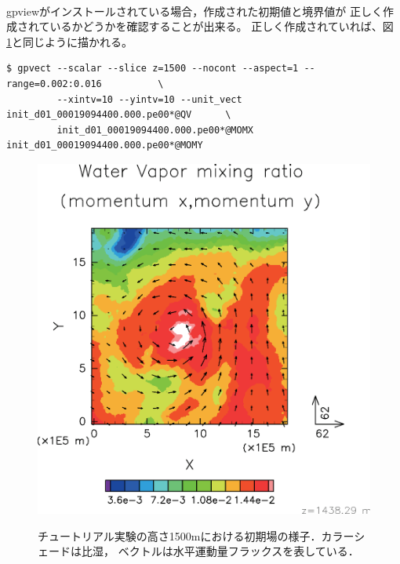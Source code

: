 \vspace{1cm}
 \hrulefill \\
gpviewがインストールされている場合，作成された初期値と境界値が
正しく作成されているかどうかを確認することが出来る。
正しく作成されていれば、図 \ref{fig:init}と同じように描かれる。

\begin{verbatim}
$ gpvect --scalar --slice z=1500 --nocont --aspect=1 --range=0.002:0.016          \
         --xintv=10 --yintv=10 --unit_vect init_d01_00019094400.000.pe00*@QV      \
         init_d01_00019094400.000.pe00*@MOMX init_d01_00019094400.000.pe00*@MOMY
\end{verbatim}


\begin{figure}[h]
\begin{center}
  \includegraphics[width=0.7\hsize]{./figure/init_qv-momxy.eps}\\
  \caption{チュートリアル実験の高さ1500mにおける初期場の様子．カラーシェードは比湿，
           ベクトルは水平運動量フラックスを表している．}
  \label{fig:init}
\end{center}
\end{figure}

